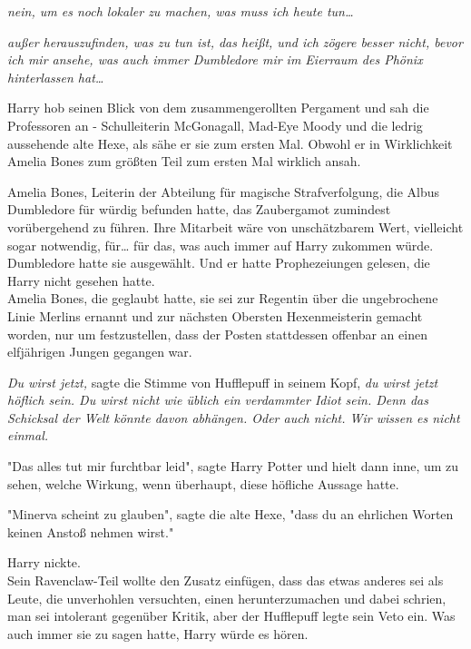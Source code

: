 {\emph{nein, um es noch lokaler zu machen, was muss ich heute tun…}

\emph{außer herauszufinden, was zu tun ist, das heißt, und ich zögere besser nicht, bevor ich mir ansehe, was auch immer Dumbledore mir im Eierraum des Phönix hinterlassen hat…}

Harry hob seinen Blick von dem zusammengerollten Pergament und sah die Professoren an - Schulleiterin McGonagall, Mad-Eye Moody und die ledrig aussehende alte Hexe, als sähe er sie zum ersten Mal. Obwohl er in Wirklichkeit Amelia Bones zum größten Teil zum ersten Mal wirklich ansah.

Amelia Bones, Leiterin der Abteilung für magische Strafverfolgung, die Albus Dumbledore für würdig befunden hatte, das Zaubergamot zumindest vorübergehend zu führen. Ihre Mitarbeit wäre von unschätzbarem Wert, vielleicht sogar notwendig, für… für das, was auch immer auf Harry zukommen würde. Dumbledore hatte sie ausgewählt. Und er hatte Prophezeiungen gelesen, die Harry nicht gesehen hatte.\\ Amelia Bones, die geglaubt hatte, sie sei zur Regentin über die ungebrochene Linie Merlins ernannt und zur nächsten Obersten Hexenmeisterin gemacht worden, nur um festzustellen, dass der Posten stattdessen offenbar an einen elfjährigen Jungen gegangen war.

\emph{Du wirst jetzt,} sagte die Stimme von Hufflepuff in seinem Kopf, \emph{du wirst jetzt höflich sein. Du wirst nicht wie üblich ein verdammter Idiot sein. Denn das Schicksal der Welt könnte davon abhängen. Oder auch nicht. Wir wissen es nicht einmal.}

"Das alles tut mir furchtbar leid", sagte Harry Potter und hielt dann inne, um zu sehen, welche Wirkung, wenn überhaupt, diese höfliche Aussage hatte.

"Minerva scheint zu glauben", sagte die alte Hexe, "dass du an ehrlichen Worten keinen Anstoß nehmen wirst."

Harry nickte.\\ Sein Ravenclaw-Teil wollte den Zusatz einfügen, dass das etwas anderes sei als Leute, die unverhohlen versuchten, einen herunterzumachen und dabei schrien, man sei intolerant gegenüber Kritik, aber der Hufflepuff legte sein Veto ein. Was auch immer sie zu sagen hatte, Harry würde es hören.

}
